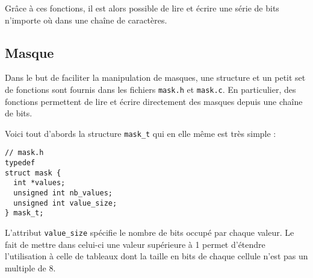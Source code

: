 Grâce à ces fonctions, il est alors possible de lire et écrire une série de bits n'importe où dans une chaîne de caractères.


\subsection{Masque}
Dans le but de faciliter la manipulation de masques, une structure et un petit set de fonctions sont fournis dans les fichiers \texttt{mask.h} et \texttt{mask.c}. En particulier, des fonctions permettent de lire et écrire directement des masques depuis une chaîne de bits.

Voici tout d'abords la structure \texttt{mask\_t} qui en elle même est très simple :
\lstset{language=C}
\begin{lstlisting}
// mask.h
typedef
struct mask {
  int *values;
  unsigned int nb_values;
  unsigned int value_size;
} mask_t;
\end{lstlisting}

L'attribut \texttt{value\_size} spécifie le nombre de bits occupé par chaque valeur. Le fait de mettre dans celui-ci une valeur supérieure à 1 permet d'étendre l'utilisation à celle de tableaux dont la taille en bits de chaque cellule n'est pas un multiple de 8.




